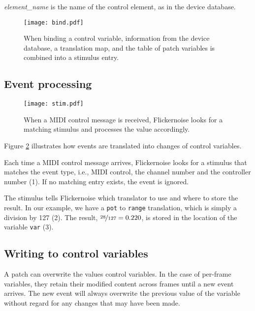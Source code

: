 \documentclass[11pt,a4paper]{article}
\begin{document}
{\em element\_name} is the name of the control element, as in the
device database.

\begin{figure}[!tb]
\begin{center}
\texttt{[image: bind.pdf]}
\end{center}
\caption{When binding a control variable, information from the device
  database, a translation map, and the table of patch variables is
  combined into a stimulus entry.}
\label{bind}
\end{figure}




\subsection{Event processing}

\begin{figure}[!tb]
\begin{center}
\texttt{[image: stim.pdf]}
\end{center}
\caption{When a MIDI control message is received, Flickernoise looks
  for a matching stimulus and processes the value accordingly.}
\label{stim}
\end{figure}

Figure \ref{stim} illustrates how events are translated into changes
of control variables.

Each time a MIDI control message arrives, Flickernoise looks for a
stimulus that matches the event type, i.e., MIDI control, the channel
number and the controller number (1). If no matching entry exists,
the event is ignored.

The stimulus tells Flickernoise which translator to use and where
to store the result. In our example, we have a {\tt pot} to {\tt range}
translation, which is simply a division by 127 (2). The result,
$\nicefrac{28}{127}=0.220$, is stored in the location of the variable
{\tt var} (3).




\subsection{Writing to control variables}

A patch can overwrite the values control variables. In the case of
per-frame variables, they retain their modified content across
frames until a new event arrives. The new event will always overwrite
the previous value of the variable without regard for any changes that
may have been made.
\end{document}
